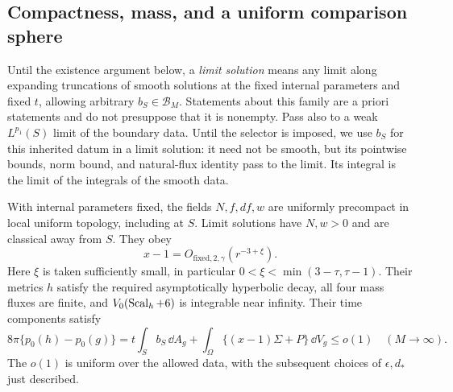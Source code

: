 \subsection{Compactness, mass, and a uniform comparison sphere}

Until the existence argument below, a \emph{limit solution} means
any limit along expanding truncations of smooth solutions at
the fixed internal parameters and fixed \(t\), allowing arbitrary
\(b_S\in\mathcal B_M\).  Statements about this family are a priori
statements and do not presuppose that it is nonempty.
Pass also to a weak \(L^{p_1}(S)\) limit of the boundary data.
Until the selector is imposed, we use \(b_S\) for this inherited
datum in a limit solution: it need not be smooth, but its
pointwise bounds, norm bound, and natural-flux identity pass
to the limit.  Its integral is the limit of the integrals of
the smooth data.

\begin{lemma}\label{lem:ah-limit-mass}
With internal parameters fixed, the fields \(N,f,df,w\)
are uniformly precompact in local uniform topology, including
at \(S\).  Limit solutions have \(N,w>0\) and are classical
away from \(S\).  They obey
\begin{equation}\label{eq:ah-conformal-decay}
 x-1=O_{\mathrm{fixed},2,\gamma}(r^{-3+\xi}).
\end{equation}
Here \(\xi\) is taken sufficiently small, in particular
\(0<\xi<\min(3-\tau,\tau-1)\).
Their metrics \(h\) satisfy the required asymptotically
hyperbolic decay, all four mass fluxes are finite, and
\(V_0(\operatorname{Scal}_h+6)\) is integrable near infinity.  Their time
components satisfy
\begin{equation}\label{eq:ah-mass-budget}
 8\pi\{p_0(h)-p_0(g)\}
   =t\int_S b_S\,\dd A_g
      +\int_\Omega\{(x-1)\Sigma+P\}\,\dd V_g
   \le o(1)\quad(M\to\infty).
\end{equation}
The \(o(1)\) is uniform over the allowed data, with the
subsequent choices of \(\epsilon,d_*\) just described.
\end{lemma}

